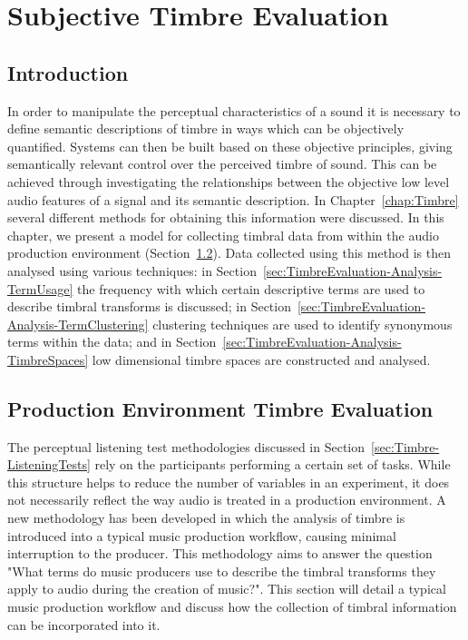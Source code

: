 \chapter{Subjective Timbre Evaluation}
\label{chap:TimbreEvaluation}

\section{Introduction}
\label{sec:TimbreEvaluation-Introduction}
	In order to manipulate the perceptual characteristics of a sound it is necessary to define semantic descriptions of
	timbre in ways which can be objectively quantified. Systems can then be built based on these objective principles,
	giving semantically relevant control over the perceived timbre of sound. This can be achieved through investigating
	the relationships between the objective low level audio features of a signal and its semantic description.  In
	Chapter~\ref{chap:Timbre} several different methods for obtaining this information were discussed. In this chapter,
	we present a model for collecting timbral data from within the audio production environment
	(Section~\ref{sec:TimbreEvaluation-DAWBasedTimbreEvaluation}). Data collected using this method is then analysed
	using various techniques: in Section~\ref{sec:TimbreEvaluation-Analysis-TermUsage} the frequency with which certain
	descriptive terms are used to describe timbral transforms is discussed; in
	Section~\ref{sec:TimbreEvaluation-Analysis-TermClustering} clustering techniques are used to identify synonymous
	terms within the data; and in Section~\ref{sec:TimbreEvaluation-Analysis-TimbreSpaces} low dimensional timbre
	spaces are constructed and analysed.

\section{Production Environment Timbre Evaluation} %
\label{sec:TimbreEvaluation-DAWBasedTimbreEvaluation}
	The perceptual listening test methodologies discussed in Section~\ref{sec:Timbre-ListeningTests} rely on the
	participants performing a certain set of tasks. While this structure helps to reduce the number of variables in an
	experiment, it does not necessarily reflect the way audio is treated in a production environment. A new methodology
	has been developed in which the analysis of timbre is introduced into a typical music production workflow, causing
	minimal interruption to the producer. This methodology aims to answer the question "What terms do music producers
	use to describe the timbral transforms they apply to audio during the creation of music?". This section will
	detail a typical music production workflow and discuss how the collection of timbral information can be
	incorporated into it.


